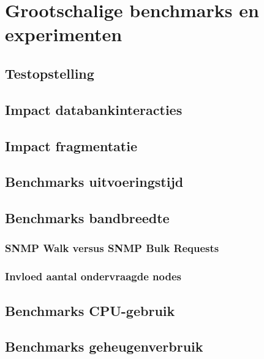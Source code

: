 \section{Grootschalige benchmarks en experimenten}

\subsection{Testopstelling}


\subsection{Impact databankinteracties}

\subsection{Impact fragmentatie}

\subsection{Benchmarks uitvoeringstijd}


\subsection{Benchmarks bandbreedte}

\subsubsection{SNMP Walk versus SNMP Bulk Requests}

\subsubsection{Invloed aantal ondervraagde nodes}

\subsection{Benchmarks CPU-gebruik}

\subsection{Benchmarks geheugenverbruik}